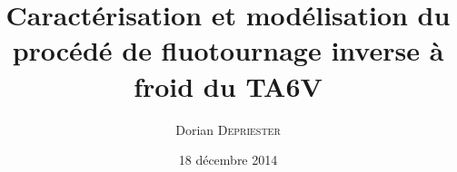 \makeatletter
\newcommand{\pagedegarde}{
\newgeometry{top=2.5cm, bottom=2cm, left=2cm, right=1cm}
\AddToShipoutPicture*{\BackgroundPic}
\AddToShipoutPicture*{\EtiquetteThese}
  \begin{titlepage}
  \centering
      \texttt{[image: Frontmatter/img/ParisTech-Institute.pdf]}
      \hfill
      \texttt{[image: Frontmatter/img/Mines.pdf]}\\
    \vspace{1cm}
      {\Large \'{E}cole doctorale \no 364 : Sciences Fondamentales et Appliquées}\\
    \vspace{1cm}
      {\huge 
      	{\bfseries Doctorat ParisTech}\\
    \vspace{0.5cm}
      	TH\`{E}SE}\\
    \vspace{1cm}
   		{\bfseries pour obtenir le grade de docteur délivré par}\\
    \vspace{1cm}
    	{\huge\bfseries \@ecole}\\
    \vspace{0.5cm}
    	{\Large{\bfseries Spécialité doctorale ``\@specialite''}}\\
    \vspace{2cm}
    	\textit{présentée et soutenue publiquement par}\\
    \vspace{0.5cm}
    	{\Large {\bfseries \@author}} \\
    \vspace{0.5cm}
    	le \@date \\
    \vfill
       {\LARGE \color[rgb]{0,0,1} \bfseries{\@title}} \\
    \vfill
        Directeur de thèse : {\bfseries \@directeur}\\
        Co-encadrant de thèse : {\bfseries \@encadrant}\\
    \vfill
	\begin{tabular}{>{\bfseries}llr}
		\large Jury\\
		\@jurya
		\@juryb
		\@juryc
		\@juryd
		\@jurye
		\@juryf
		\@juryg
		\@juryh
		\@juryi
	\end{tabular}
	\vfill
	
	\textbf{MINES ParisTech\\
	Centre de Mise Forme des Mat\'{e}riaux (CEMEF)}\\
	UMR CNRS 7635, F-06904 Sophia Antipolis, France
  \end{titlepage}
  
\restoregeometry    
}
\makeatother


\author{Dorian \scshape{Depriester}}
\title{Caractérisation et modélisation du procédé de fluotournage inverse à froid du TA6V}
\date{18 décembre 2014}
